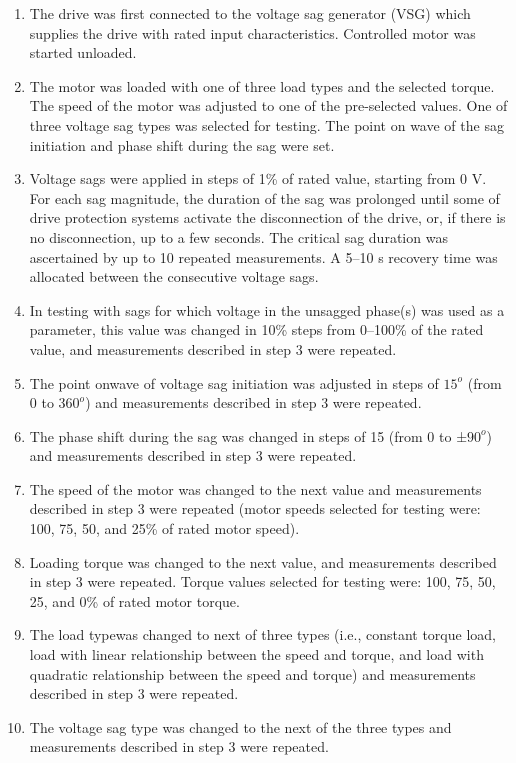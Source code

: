 \documentclass[17pt, a4paper]{extreport}
\begin{document}
 \begin{enumerate}
     \item The drive was first connected to the voltage sag generator (VSG) which supplies the drive with rated input characteristics. Controlled motor was started unloaded.
     
     \item The motor was loaded with one of three load types and the selected torque. The speed of the motor was adjusted to one of the pre-selected values. One of three voltage sag types was selected for testing. The point on wave of the sag initiation and phase shift during the sag were set.
     
     \item Voltage sags were applied in steps of 1\% of rated value, starting from 0 V. For each sag magnitude, the duration of
the sag was prolonged until some of drive protection systems activate the disconnection of the drive, or, if there is no disconnection, up to a few seconds. The critical sag duration was ascertained by up to 10 repeated measurements. A 5–10 s recovery time was allocated between the consecutive voltage sags.

\item In testing with sags for which voltage in the unsagged phase(s) was used as a parameter, this value was changed in 10\% steps from 0–100\% of the rated value, and measurements described in step 3 were repeated.

\item The point onwave of voltage sag initiation was adjusted in steps of $15^{o}$ (from 0 to $360^{o}$) and measurements described in step 3 were repeated.

\item The phase shift during the sag was changed in steps of 15 (from 0 to ±$90^{o}$) and measurements described in step 3 were repeated. 

\item The speed of the motor was changed to the next value and measurements described in step 3 were repeated (motor speeds selected for testing were: 100, 75, 50, and 25\% of rated motor speed).

\item Loading torque was changed to the next value, and measurements described in step 3 were repeated. Torque values selected for testing were: 100, 75, 50, 25, and 0\% of rated motor torque.

\item The load typewas changed to next of three types (i.e., constant torque load, load with linear relationship between the speed and torque, and load with quadratic relationship between the speed and torque) and measurements described in step 3 were repeated.

\item The voltage sag type was changed to the next of the three types and measurements described in step 3 were repeated.


 \end{enumerate}
 
\end{document}
